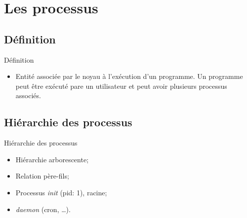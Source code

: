 \def\sectitle{Les processus}
\section{\sectitle}

\begin{frame}

\def\subsectitle{Définition}
\subsection{\subsectitle}


\begin{alertblock}{\subsectitle}
\begin{itemize}
    \item Entité associée par le noyau à l'exécution d'un programme. Un
    programme peut être exécuté pare un utilisateur et peut avoir plusieurs
    processus associés.
\end{itemize}
\end{alertblock}

\def\subsectitle{Hiérarchie des processus}
\subsection{\subsectitle}

\begin{block}{\subsectitle}
\begin{itemize}
    \item Hiérarchie arborescente;
    \item Relation père-fils;
    \item Processus \textit{init} (pid: 1), racine;
    \item \textit{daemon} (cron, \dots).
\end{itemize}

\end{block}



\end{frame}




